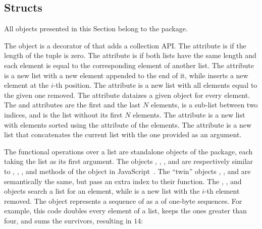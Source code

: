 
\subsection{Structs}\label{sec:structs}

All objects presented in this Section belong to the  package.

The object  is a decorator of  that adds a
  collection API.
%
The attribute  is  if the length of the tuple is zero.
%
The attribute  is  if both lists have the same length
  and each element is equal to the corresponding element of another list.
%
The attribute  is a new list with a new element
  appended to the end of it, while  inserts a new element
  at the \(i\)-th position.
%
The attribute  is a new list with all elements equal
  to the given one removed.
%
The attribute  dataizes a given object for every element.
%
The  and  attributes are the first and the last
  \(N\) elements,  is a sub-list between two indices, and
   is the list without its first \(N\) elements.
%
The  attribute is a new list with elements sorted using
  the  attribute of the elements.
%
The  attribute is a new list that concatenates
  the current list with the one provided as an argument.

The functional operations over a list are standalone objects of the
   package, each taking the list as its first argument.
The objects , , , and
   are respectively similar to , ,
  , and  methods of the  object
  in JavaScript~\citep{EcmaScript}.
The ``twin'' objects , , and 
  are semantically the same, but pass an extra  index to their
  function.
The , , and  objects
  search a list for an element, while  is a new list with
  the \(i\)-th element removed.
The  object represents a sequence of 
  as a  of one-byte sequences.
For example, this code doubles every element of a list,
  keeps the ones greater than four,
  and sums the survivors, resulting in \(14\):

